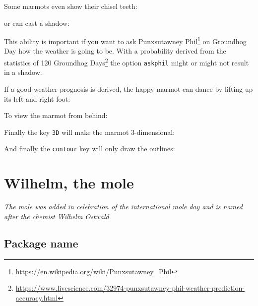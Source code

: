 \documentclass[parskip=half]{scrartcl}
\begin{document}
Some marmots even show their chisel teeth:
\begin{tcblisting}{}
\marmot[teeth=white]
\end{tcblisting}

or can cast a shadow:
\begin{tcblisting}{}
\marmot[shadow]
\end{tcblisting}

This ability is important if you want to ask Punxsutawney Phil\footnote{\url{https://en.wikipedia.org/wiki/Punxsutawney_Phil}} on Groundhog Day how the weather is going to be. With a probability derived from the statistics of 120 Groundhog Days\footnote{\url{https://www.livescience.com/32974-punxsutawney-phil-weather-prediction-accuracy.html}} the option \lstinline|askphil| might or might not result in a shadow.
\begin{tcblisting}{}
\marmot[askphil]
\end{tcblisting}

If a good weather prognosis is derived, the happy marmot can dance by lifting up its left and right foot: 
\begin{tcblisting}{}
\marmot[leftstep]
\marmot[rightstep,xshift=2cm]
\end{tcblisting}

To view the marmot from behind:
\begin{tcblisting}{}
\marmot[back]
\end{tcblisting}

Finally the key \lstinline|3D| will make the marmot 3-dimensional:
\begin{tcblisting}{}
\marmot[3D]
\end{tcblisting}

And finally the \lstinline|contour| key will only draw the outlines:
\begin{tcblisting}{}
\marmot[contour=black]
\end{tcblisting}

%
%
\clearpage
\section[Mole]{Wilhelm, the mole}

\emph{The mole was added in celebration of the international mole day and is named after the chemist Wilhelm Ostwald}

\subsection{Package name}
\end{document}
